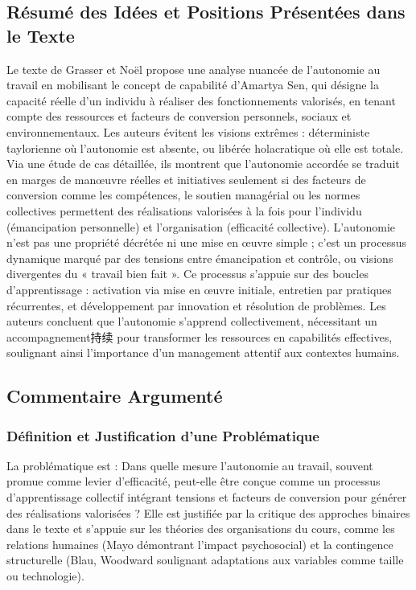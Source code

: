 \documentclass[11pt]{rapportECL}
\begin{document}
\subsection{Résumé des Idées et Positions Présentées dans le Texte}
Le texte de Grasser et Noël propose une analyse nuancée de l’autonomie au travail en mobilisant le concept de capabilité d’Amartya Sen, qui désigne la capacité réelle d’un individu à réaliser des fonctionnements valorisés, en tenant compte des ressources et facteurs de conversion personnels, sociaux et environnementaux. Les auteurs évitent les visions extrêmes : déterministe taylorienne où l’autonomie est absente, ou libérée holacratique où elle est totale. Via une étude de cas détaillée, ils montrent que l’autonomie accordée se traduit en marges de manœuvre réelles et initiatives seulement si des facteurs de conversion comme les compétences, le soutien managérial ou les normes collectives permettent des réalisations valorisées à la fois pour l’individu (émancipation personnelle) et l’organisation (efficacité collective). L’autonomie n’est pas une propriété décrétée ni une mise en œuvre simple ; c’est un processus dynamique marqué par des tensions entre émancipation et contrôle, ou visions divergentes du « travail bien fait ». Ce processus s’appuie sur des boucles d’apprentissage : activation via mise en œuvre initiale, entretien par pratiques récurrentes, et développement par innovation et résolution de problèmes. Les auteurs concluent que l’autonomie s’apprend collectivement, nécessitant un accompagnement持续 pour transformer les ressources en capabilités effectives, soulignant ainsi l’importance d’un management attentif aux contextes humains.

\subsection{Commentaire Argumenté}

\subsubsection{Définition et Justification d’une Problématique}
La problématique est : Dans quelle mesure l’autonomie au travail, souvent promue comme levier d’efficacité, peut-elle être conçue comme un processus d’apprentissage collectif intégrant tensions et facteurs de conversion pour générer des réalisations valorisées ? Elle est justifiée par la critique des approches binaires dans le texte et s’appuie sur les théories des organisations du cours, comme les relations humaines (Mayo démontrant l’impact psychosocial) et la contingence structurelle (Blau, Woodward soulignant adaptations aux variables comme taille ou technologie).
\end{document}
